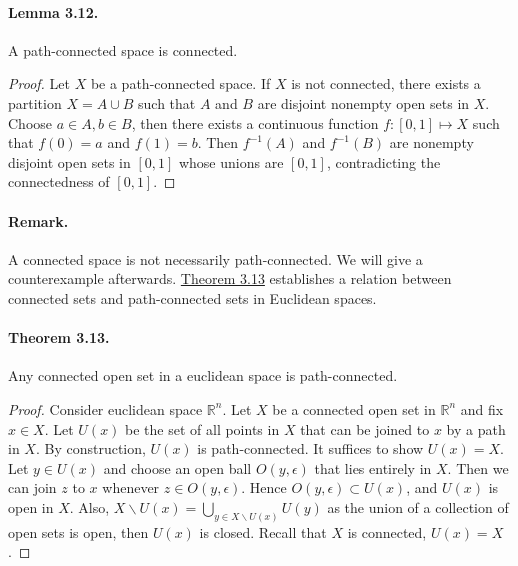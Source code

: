 \documentclass{article}
\numberwithin{equation}{section}
\theoremstyle{plain}
\theoremstyle{definition}
\begin{document}
\paragraph{Lemma 3.12.\label{lemma:3.12}} A path-connected space is connected.
\begin{proof}
Let $X$ be a path-connected space. If $X$ is not connected, there exists a partition $X=A\cup B$ such that $A$ and $B$ are disjoint nonempty open sets in $X$. Choose $a\in A,b\in B$, then there exists a continuous function $f:[0,1]\mapsto X$ such that $f(0)=a$ and $f(1)=b$. Then $f^{-1}(A)$ and $f^{-1}(B)$ are nonempty disjoint open sets in $[0,1]$ whose unions are $[0,1]$, contradicting the connectedness of $[0,1]$.
\end{proof}

\paragraph{Remark.} A connected space is not necessarily path-connected. We will give a counterexample afterwards. \hyperref[thm:3.13]{Theorem 3.13} establishes a relation between connected sets and path-connected sets in Euclidean spaces.

\paragraph{Theorem 3.13.\label{thm:3.13}} Any connected open set in a euclidean space is path-connected.
\begin{proof}
Consider euclidean space $\mathbb{R}^n$. Let $X$ be a connected open set in $\mathbb{R}^n$ and fix $x\in X$. Let $U(x)$ be the set of all points in $X$ that can be joined to $x$ by a path in $X$. By construction, $U(x)$ is path-connected. It suffices to show $U(x)=X$. Let $y\in U(x)$ and choose an open ball $O(y,\epsilon)$ that lies entirely in $X$. Then we can join $z$ to $x$ whenever $z\in O(y,\epsilon)$. Hence $O(y,\epsilon)\subset U(x)$, and $U(x)$ is open in $X$. Also, $X\backslash U(x) = \bigcup_{y\in X\backslash U(x)} U(y)$ as the union of a collection of open sets is open, then $U(x)$ is closed. Recall that $X$ is connected, $U(x)=X$.
\end{proof}
\end{document}

